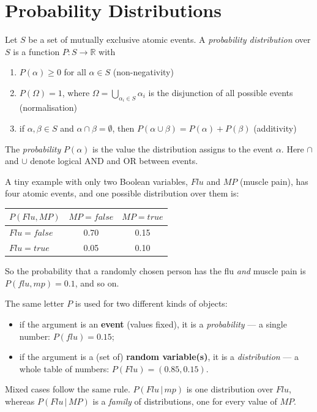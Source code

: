 \documentclass[11pt, oneside]{book}
\newcommand{\R}{\mathbb{R}}
\newcommand{\Prob}{\mathbb{P}}           %
\newcommand{\given}{\,\vert\,}           %
\newcommand{\vn}[1]{\mathit{#1}}         %
\let\originalsection\section
\renewcommand{\section}{\Needspace{7\baselineskip}\originalsection}
\begin{document}
\section{Probability Distributions}

\begin{defbox}[title={Probability distribution}]
Let $S$ be a set of mutually exclusive atomic events. A \emph{probability
distribution} over $S$ is a function $P: S \to \R$ with
\begin{enumerate}
  \item $P(\alpha) \geq 0$ for all $\alpha \in S$ \hfill (non-negativity)
  \item $P(\Omega) = 1$, where $\Omega = \bigcup_{\alpha_i \in S} \alpha_i$ is
    the disjunction of all possible events \hfill (normalisation)
  \item if $\alpha, \beta \in S$ and $\alpha \cap \beta = \emptyset$, then
    $P(\alpha \cup \beta) = P(\alpha) + P(\beta)$ \hfill (additivity)
\end{enumerate}
The \emph{probability} $P(\alpha)$ is the value the distribution assigns to the
event $\alpha$. Here $\cap$ and $\cup$ denote logical AND and OR between
events.
\end{defbox}

A tiny example with only two Boolean variables, $\vn{Flu}$ and $\vn{MP}$
(muscle pain), has four atomic events, and one possible distribution over them
is:
\begin{center}
\small
\begin{tabular}{@{}lcc@{}}
\toprule
$P(\vn{Flu}, \vn{MP})$ & $\vn{MP} = \vn{false}$ & $\vn{MP} = \vn{true}$ \\
\midrule
$\vn{Flu} = \vn{false}$ & 0.70 & 0.15 \\
$\vn{Flu} = \vn{true}$  & 0.05 & 0.10 \\
\bottomrule
\end{tabular}
\end{center}
So the probability that a randomly chosen person has the flu \emph{and} muscle
pain is $P(\vn{flu}, \vn{mp}) = 0.1$, and so on.

\begin{notebox}[title={Probability or distribution? Look at the argument}]
The same letter $P$ is used for two different kinds of objects:
\begin{itemize}
  \item if the argument is an \textbf{event} (values fixed), it is a
    \emph{probability} --- a single number: $P(\vn{flu}) = 0.15$;
  \item if the argument is a (set of) \textbf{random variable(s)}, it is a
    \emph{distribution} --- a whole table of numbers:
    $P(\vn{Flu}) = (0.85, 0.15)$.
\end{itemize}
Mixed cases follow the same rule. $P(\vn{Flu} \given \vn{mp})$ is one
distribution over $\vn{Flu}$, whereas $P(\vn{Flu} \given \vn{MP})$ is a
\emph{family} of distributions, one for every value of $\vn{MP}$.
\end{notebox}
\end{document}
